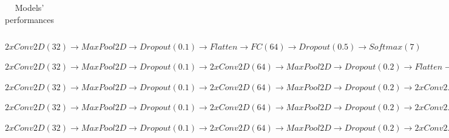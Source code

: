 \begin{table}[H]
\begin{threeparttable}
\begin{tabular}{ |>{\centering\arraybackslash}p{2cm}|c|c|c|c|c|c|c|>{\centering\arraybackslash}p{2cm}|>{\centering\arraybackslash}p{2cm}| }
				\end{tabular}		
				\begin{tablenotes}
					\item\label{tnote:model1} $2 x Conv2D(32) \rightarrow MaxPool2D \rightarrow Dropout(0.1) \rightarrow Flatten \rightarrow FC(64) \rightarrow Dropout(0.5) \rightarrow Softmax(7)$
					\item\label{tnote:model2} $2 x Conv2D(32) \rightarrow MaxPool2D \rightarrow Dropout(0.1) \rightarrow 2 x Conv2D(64) \rightarrow MaxPool2D \rightarrow Dropout(0.2) \rightarrow Flatten \rightarrow FC(128) \rightarrow Dropout(0.5) \rightarrow Softmax(7)$
					\item\label{tnote:model3} $2 x Conv2D(32) \rightarrow MaxPool2D \rightarrow Dropout(0.1) \rightarrow 2 x Conv2D(64) \rightarrow MaxPool2D \rightarrow Dropout(0.2) \rightarrow 2 x Conv2D(128) \rightarrow MaxPool2D \rightarrow Dropout(0.3) \rightarrow Flatten \rightarrow FC(256) \rightarrow Dropout(0.5) \rightarrow Softmax(7)$
					\item\label{tnote:model4} $2 x Conv2D(32) \rightarrow MaxPool2D \rightarrow Dropout(0.1) \rightarrow 2 x Conv2D(64) \rightarrow MaxPool2D \rightarrow Dropout(0.2) \rightarrow 2 x Conv2D(128) \rightarrow MaxPool2D \rightarrow Dropout(0.3) \rightarrow 2 x Conv2D(256) \rightarrow MaxPool2D \rightarrow Dropout(0.4) \rightarrow Flatten \rightarrow FC(512) \rightarrow Dropout(0.5) \rightarrow Softmax(7)$
					\item\label{tnote:model5} $2 x Conv2D(32) \rightarrow MaxPool2D \rightarrow Dropout(0.1) \rightarrow 2 x Conv2D(64) \rightarrow MaxPool2D \rightarrow Dropout(0.2) \rightarrow 2 x Conv2D(128) \rightarrow MaxPool2D \rightarrow Dropout(0.3) \rightarrow 2 x Conv2D(256) \rightarrow MaxPool2D \rightarrow Dropout(0.4) \rightarrow 2 x Conv2D(512) \rightarrow MaxPool2D \rightarrow Dropout(0.5) \rightarrow Flatten \rightarrow FC(1024) \rightarrow Dropout(0.5) \rightarrow Softmax(7)$
				\end{tablenotes}
			\end{threeparttable}
			\caption{Models' performances}
			\label{tab:models_performances}
		\end{table}
	
